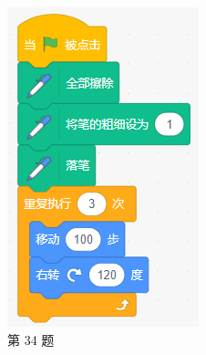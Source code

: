 \documentclass[10pt, a4paper]{article}
\begin{document}
\begin{enumerate}
\begin{figure}[htbp]
\begin{minipage}[t]{.14\textwidth}
                \includegraphics[width=\textwidth]{figure/34.png}
                \caption*{第 34 题}
            \end{minipage}
            \begin{minipage}[t]{.25\textwidth}
                \centering

\end{minipage}
\end{figure}
\end{enumerate}
\end{document}

